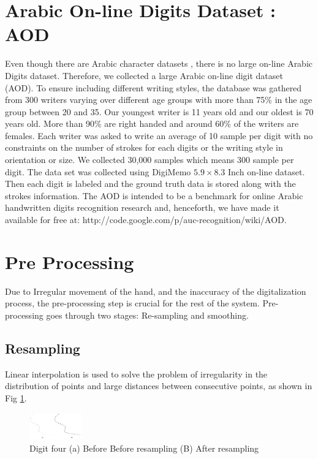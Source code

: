 \documentclass[10pt]{IEEEtran}
\begin{document}

\section{ Arabic On-line Digits Dataset : AOD}
\label{sec:Dataset}

  Even though there are Arabic character datasets \cite{Mezghani3332005,ARAlamri2008}, there is no large on-line Arabic Digits dataset. Therefore, we  collected a large Arabic on-line digit dataset (AOD). To ensure including different writing styles, the database was gathered from 300 writers varying over different age groups with more than  75\% in the age group between 20 and 35. Our youngest writer is 11 years old and our oldest is 70 years old. More than 90\%  are right handed and around  60\% of the writers are females. Each writer was asked to write an average of 10 sample per digit with no constraints on the number of strokes for each digits or the writing style in orientation or size. We collected  30,000 samples which means  300 sample per digit. The data set was collected using DigiMemo  $5.9 \times 8.3$ Inch on-line dataset. Then each digit is labeled and the  ground truth data is stored along with the strokes information. The AOD is intended to be a benchmark for online Arabic handwritten digits recognition research and, henceforth, we have made it available for free at: http://code.google.com/p/auc-recognition/wiki/AOD.

\section{Pre Processing}
\label{sec:PreProcessing}

Due to Irregular movement of the hand, and the inaccuracy of the digitalization process, the pre-processing step is crucial for the rest of the system. Pre-processing goes through two stages: Re-sampling and smoothing.

 \subsection{Resampling}

Linear interpolation\cite{Pastor2005} is used to solve the problem of irregularity in the distribution of points and large distances between consecutive points, as shown in Fig \ref{fig:pre1}.

 \begin{figure}
 \centering
 \includegraphics[width=0.2\textwidth]{pre1}
\caption{Digit four (a) Before Before resampling (B) After resampling}
 \label{fig:pre1}
 \end{figure}
\end{document}
